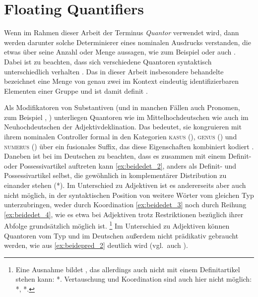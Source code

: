 \section{Floating Quantifiers}
\label{sec:floatquant}

Wenn im Rahmen dieser Arbeit der Terminus \textit{Quantor} verwendet wird, dann
werden darunter solche Determinierer eines nominalen Ausdrucks verstanden, die
etwas über seine Anzahl oder Menge aussagen, wie zum Beispiel  oder auch . Dabei ist zu beachten, dass sich verschiedene
Quantoren syntaktisch unterschiedlich verhalten
\autocites[27--28]{pittner1995}[11--12]{haspelmath1997}. Das in dieser Arbeit
insbesondere behandelte  bezeichnet eine Menge von genau zwei
im Kontext eindeutig identifizierbaren Elementen einer Gruppe
\autocite[vgl.][307]{keenan2006} und ist damit definit
\autocite[265--268]{lyons1999}.

Als Modifikatoren von Substantiven (und in manchen Fällen auch Pronomen, zum
Beispiel , ) unterliegen Quantoren wie
 im Mittelhochdeutschen wie auch  im Neuhochdeutschen
der Adjektivdeklination. Das bedeutet, sie kongruieren mit ihrem nominalen
Controller formal in den Kategorien \textsc{kasus} (\Case),
\textsc{genus} (\Gend) und \textsc{numerus} (\Num) über ein
fusionales Suffix, das diese Eigenschaften kombiniert kodiert
\autocites(vgl.~auch
\cref{sec:ctrltarg,sec:lfgkongr})[181--184]{ksw2}[772]{woellstein2022}.
Daneben ist bei  im Deutschen zu beachten, dass es zusammen mit einem
Definit- oder Possessivartikel auftreten kann \cref{ex:beidedet_2}, anders als
Definit- und Possessivartikel selbst, die gewöhnlich in komplementärer
Distribution zu einander stehen (*). Im Unterschied zu
Adjektiven ist es andererseits aber auch nicht möglich, in der syntaktischen
Position von  weitere Wörter vom gleichen Typ unterzubringen, weder
durch Koordination \cref{ex:beidedet_3} noch durch Reihung
\cref{ex:beidedet_4}, wie es etwa bei Adjektiven trotz Restriktionen
bezüglich ihrer Abfolge grundsätzlich möglich ist.%
%
	\footnote{Eine Ausnahme bildet , das allerdings auch nicht
		mit einem Definitartikel stehen kann: *.
		Vertauschung und Koordination sind auch hier nicht möglich: *, *.%
	}
%
Im Unterschied zu Adjektiven können Quantoren vom Typ  und 
im Deutschen außerdem nicht prädikativ gebraucht werden, wie aus
\cref{ex:beidepred_2} deutlich wird (vgl.~auch \cite[181,
Anm.~1]{merchant1996}).

